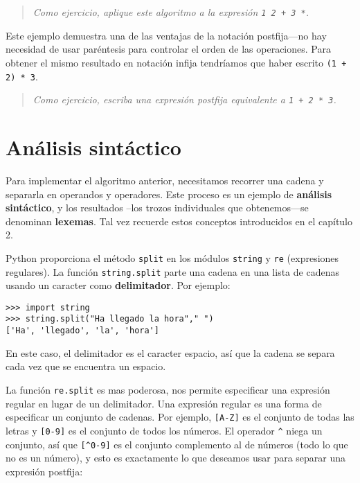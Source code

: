 \begin{quote}
{\em Como ejercicio, aplique este algoritmo a la expresión
\texttt{1 2 + 3 *}.}
\end{quote}

Este ejemplo demuestra una de las ventajas de la notación postfija---no
hay necesidad de usar paréntesis para controlar el orden de las operaciones.
Para obtener el mismo resultado en notación infija tendríamos que haber
escrito \texttt{(1 + 2) * 3}.

\begin{quote}
{\em Como ejercicio, escriba una expresión postfija equivalente a
\texttt{1 + 2 * 3}.}
\end{quote}


\section {Análisis sintáctico}

Para implementar el algoritmo anterior, necesitamos recorrer una cadena
y separarla en operandos y operadores.  Este proceso es un ejemplo de
 {\bf análisis sintáctico}, y los resultados --los trozos individuales
que obtenemos---se denominan  {\bf lexemas}.  Tal vez recuerde estos 
conceptos introducidos en el capítulo 2.

Python proporciona el método  \texttt{split} en los módulos \texttt{string} y {\tt re} (expresiones regulares). La función \texttt{string.split}
parte una cadena en una lista de cadenas usando un caracter como  {\bf delimitador}.
Por ejemplo:

\beforeverb
\begin{verbatim}
>>> import string
>>> string.split("Ha llegado la hora"," ")
['Ha', 'llegado', 'la', 'hora']
\end{verbatim}
\afterverb
%
En este caso, el delimitador es el caracter espacio, así que la cadena
se separa cada vez que se encuentra un espacio.

La función \texttt{re.split} es mas poderosa, nos permite especificar una
expresión regular en lugar de un delimitador. Una expresión regular es 
una forma de especificar un conjunto de cadenas. Por ejemplo, \verb+[A-Z]+ es 
el conjunto de todas las letras y \verb+[0-9]+ es el conjunto de todos los
números.  El operador \verb+^+ niega un conjunto, así que  \verb+[^0-9]+ es el
conjunto complemento al de números (todo lo que no es un número), y esto 
es exactamente lo que deseamos usar para separar una expresión postfija:

